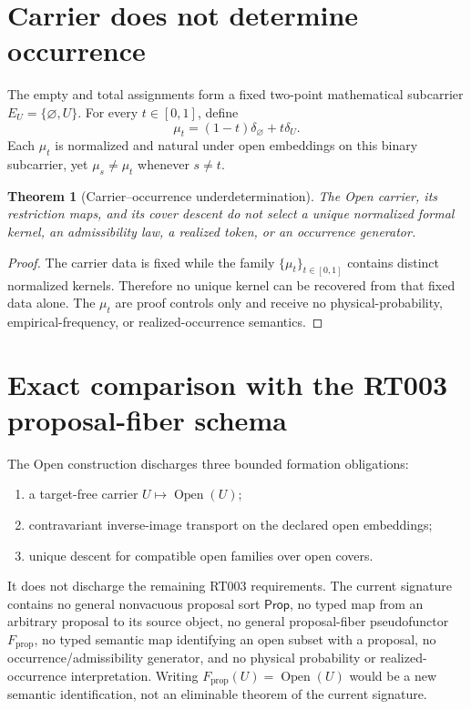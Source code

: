 \documentclass[11pt]{article}
\newtheorem{theorem}{Theorem}
\begin{document}
\section{Carrier does not determine occurrence}

The empty and total assignments form a fixed two-point mathematical subcarrier
$E_U=\{\varnothing,U\}$.  For every $t\in[0,1]$, define
\[
  \mu_t=(1-t)\delta_{\varnothing}+t\delta_U.
\]
Each $\mu_t$ is normalized and natural under open embeddings on this binary
subcarrier, yet $\mu_s\neq\mu_t$ whenever $s\neq t$.

\begin{theorem}[Carrier--occurrence underdetermination]
The Open carrier, its restriction maps, and its cover descent do not select a
unique normalized formal kernel, an admissibility law, a realized token, or an
occurrence generator.
\end{theorem}

\begin{proof}
The carrier data is fixed while the family $\{\mu_t\}_{t\in[0,1]}$ contains
distinct normalized kernels.  Therefore no unique kernel can be recovered from
that fixed data alone.  The $\mu_t$ are proof controls only and receive no
physical-probability, empirical-frequency, or realized-occurrence semantics.
\end{proof}

\section{Exact comparison with the RT003 proposal-fiber schema}

The Open construction discharges three bounded formation obligations:

\begin{enumerate}
  \item a target-free carrier $U\mapsto\operatorname{Open}(U)$;
  \item contravariant inverse-image transport on the declared open embeddings;
  \item unique descent for compatible open families over open covers.
\end{enumerate}

It does not discharge the remaining RT003 requirements.  The current signature
contains no general nonvacuous proposal sort $\mathsf{Prop}$, no typed map from
an arbitrary proposal to its source object, no general proposal-fiber
pseudofunctor $F_{\mathrm{prop}}$, no typed semantic map identifying an open
subset with a proposal, no occurrence/admissibility generator, and no physical
probability or realized-occurrence interpretation.  Writing
$F_{\mathrm{prop}}(U)=\operatorname{Open}(U)$ would be a new semantic
identification, not an eliminable theorem of the current signature.
\end{document}
